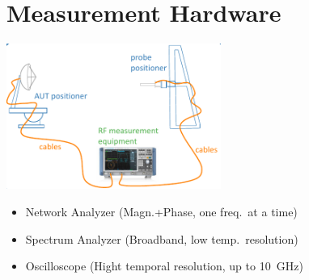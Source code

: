 \section{Measurement Hardware}
\includegraphics[width=7cm]{content/at_meas/pictures/measurement_hardware}
\begin{itemize}
  \item Network Analyzer (Magn.+Phase, one freq.\ at a time)
  \item Spectrum Analyzer (Broadband, low temp.\ resolution)
  \item Oscilloscope (Hight temporal resolution, up to \SI{10}{GHz})
\end{itemize}
